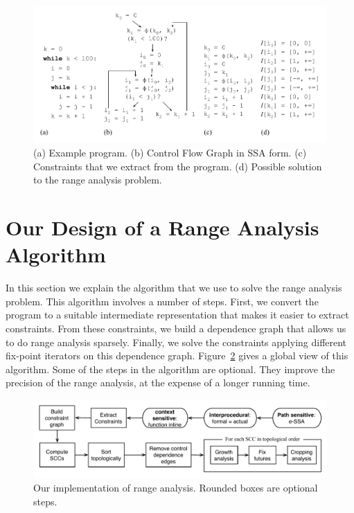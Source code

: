 \documentclass{llncs}
\begin{document}
\begin{figure}[t!]
\begin{center}
\includegraphics[width=1\textwidth]{images/ex1}
\end{center}
\caption{\label{fig:ex1}
(a) Example program.
(b) Control Flow Graph in SSA form.
(c) Constraints that we extract from the program.
(d) Possible solution to the range analysis problem.}
\end{figure}

\section{Our Design of a Range Analysis Algorithm}
\label{sec:algo}


In this section we explain the algorithm that we use to solve the range
analysis problem.
This algorithm involves a number of steps.
First, we convert the program to a suitable intermediate representation that
makes it easier to extract constraints.
From these constraints, we build a dependence graph that allows us to do
range analysis sparsely.
Finally, we solve the constraints applying different fix-point iterators on
this dependence graph.
Figure~\ref{fig:algorithm} gives a global view of this algorithm.
Some of the steps in the algorithm are optional.
They improve the precision of the range analysis, at the expense of a longer
running time.

\begin{figure}[t!]
\begin{center}
\includegraphics[width=1\textwidth]{images/algorithm}
\end{center}
\caption{\label{fig:algorithm}
Our implementation of range analysis.
Rounded boxes are optional steps.}
\end{figure}
\end{document}
